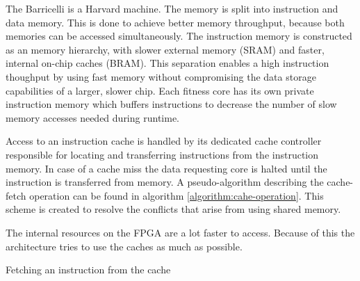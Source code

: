 The Barricelli is a Harvard machine.
The memory is split into instruction and data memory.
This is done to achieve better memory throughput, because both memories can be accessed simultaneously.
The instruction memory is constructed as an memory hierarchy, with slower external memory (SRAM) and faster, internal on-chip caches (BRAM).
This separation enables a high instruction thoughput by using fast memory without compromising the data storage capabilities of a larger, slower chip.
Each fitness core has its own private instruction memory which buffers instructions to decrease the number of slow memory accesses needed during runtime.

Access to an instruction cache is handled by its dedicated cache controller responsible for locating and transferring instructions from the instruction memory.
In case of a cache miss the data requesting core is halted until the instruction is transferred from memory.
A pseudo-algorithm describing the cache-fetch operation can be found in algorithm \vref{algorithm:cahe-operation}.
This scheme is created to resolve the conflicts that arise from using shared memory. 

The internal resources on the FPGA are a lot faster to access.
Because of this the architecture tries to use the caches as much as possible.

\begin{algorithm}[H]
\SetAlgoLined
\DontPrintSemicolon
{}
\Begin{
    \If{$ a = Ca[A \bmod{512}] $}{
        \Return{$ Ci[A \bmod{512}] $}
    }\Else{
        $ Caa \bmod{512}] \longleftarrow a $\;
        $ Ci[a \bmod{512}] \longleftarrow M[a] $\;
        \Return{$ Ci[A \bmod{512}] $}
    }
}
\caption{Fetching an instruction from the cache}
\label{algorithm:cache-operation}
\end{algorithm}

